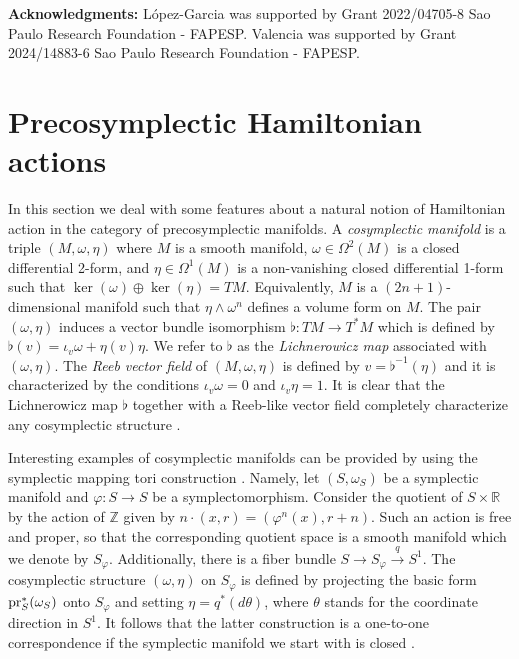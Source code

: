 \documentclass[
  a4paper, 
  reqno, 
  oneside, 
  12pt
]{amsart}
\theoremstyle{definition}
\theoremstyle{remark}
\begin{document}
\vspace{.2cm}
{\bf Acknowledgments:} L\'opez-Garcia was supported by Grant 2022/04705-8 Sao Paulo Research Foundation - FAPESP. Valencia was supported by Grant 2024/14883-6 Sao Paulo Research Foundation - FAPESP.

\section{Precosymplectic Hamiltonian actions}

In this section we deal with some features about a natural notion of Hamiltonian action in the category of precosymplectic manifolds. A \emph{cosymplectic manifold} is a triple $(M,\omega,\eta)$ where $M$ is a smooth manifold, $\omega\in \Omega^2(M)$ is a closed differential 2-form, and $\eta\in \Omega^1(M)$ is a non-vanishing closed differential 1-form such that $\ker(\omega)\oplus \ker(\eta)=TM$. Equivalently, $M$ is a $(2n+1)$-dimensional manifold such that $\eta\wedge \omega^n$ defines a volume form on $M$. The pair $(\omega,\eta)$ induces a vector bundle isomorphism $\flat:TM \to T^\ast M$ which is defined by $\flat(v)=\iota_v\omega +\eta(v)\eta$. We refer to $\flat$ as the \emph{Lichnerowicz map} associated with $(\omega,\eta)$. The  \emph{Reeb vector field} of $(M,\omega,\eta)$ is defined by  $v=\flat^{-1}(\eta)$ and it is characterized by the conditions $\iota_v\omega=0$ and $\iota_v\eta=1$.  It is clear that the Lichnerowicz map $\flat$ together with a Reeb-like vector field completely characterize any cosymplectic structure \cite{Albert}.

Interesting examples of  cosymplectic manifolds can be provided by using the symplectic mapping tori construction \cite{BazzoniGoertsches2,FernandesIglesias,Li}. Namely, let $(S,\omega_S)$ be a symplectic manifold and $\varphi:S\to S$ be a symplectomorphism. Consider the quotient of $S\times \mathbb{R}$ by the action of $\mathbb{Z}$ given by $n\cdot (x,r)=(\varphi^n(x),r+n)$. Such an action is free and proper, so that the corresponding quotient space is a smooth manifold which we denote by $S_\varphi$. Additionally, there is a fiber bundle $S\to S_\varphi\xrightarrow{q} S^1$. The cosymplectic structure $(\omega,\eta)$ on $S_\varphi$ is defined by projecting the basic form $\textnormal{pr}_S^\ast (\omega_S)$ onto $S_\varphi$ and setting $\eta=q^\ast (d\theta)$, where $\theta$ stands for the coordinate direction in $S^1$. It follows that the latter construction is a one-to-one correspondence if the symplectic manifold we start with is closed \cite{Li}.
\end{document}
